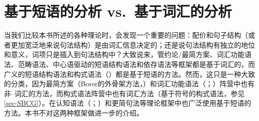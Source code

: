 \chapter{基于短语的分析 vs.\ 基于词汇的分析}
\label{Abschnitt-Phrasal-Lexikalisch}\label{chap-phrasal}

当我们比较本书所述的各种理论时，会发现一个重要的问题：配价和句子结构（或者更加宽泛地来说句法结构）是由词汇信息决定的；还是说句法结构有独立的地位和意义，词项只是插入到句法结构中？大致说来，管约论/最简方案、词汇功能语法、范畴语法、中心语驱动的短语结构语法和依存语法等框架都是基于词汇的，而广义的短语结构语法和构式语法（\citealp{Goldberg95a,Goldberg2003b,Tomasello2003a,Tomasello2006c,Croft2001a}）都是基于短语的方法。然而，这只是一种大致的分类，因为最简方案（Borer的外骨架方法，\citeyear{Borer2003a-u}）和词汇功能语法（\citealp{Alsina96a}；\citealp{ADT2008a,ADT2013a}）阵营中也有非--词汇的方法，而构式语法阵营中也有词汇方法（基于符号的构式语法，参见\ref{sec-SBCG}）。在认知语法（\citealp{Dabrowska2001a}；\citealp[]{Langacker2009a}）和更简句法\citep{CJ2005a,Jackendoff2008a}等理论框架中也广泛使用基于短语的方法。本书不对这两种框架做进一步的介绍。
